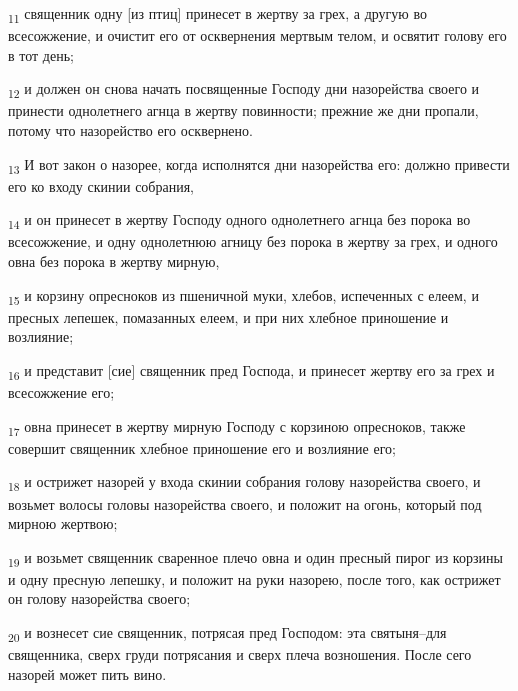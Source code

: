 \begin{tcolorbox}
\textsubscript{11} священник одну [из птиц] принесет в жертву за грех, а другую во всесожжение, и очистит его от осквернения мертвым телом, и освятит голову его в тот день;
\end{tcolorbox}
\begin{tcolorbox}
\textsubscript{12} и должен он снова начать посвященные Господу дни назорейства своего и принести однолетнего агнца в жертву повинности; прежние же дни пропали, потому что назорейство его осквернено.
\end{tcolorbox}
\begin{tcolorbox}
\textsubscript{13} И вот закон о назорее, когда исполнятся дни назорейства его: должно привести его ко входу скинии собрания,
\end{tcolorbox}
\begin{tcolorbox}
\textsubscript{14} и он принесет в жертву Господу одного однолетнего агнца без порока во всесожжение, и одну однолетнюю агницу без порока в жертву за грех, и одного овна без порока в жертву мирную,
\end{tcolorbox}
\begin{tcolorbox}
\textsubscript{15} и корзину опресноков из пшеничной муки, хлебов, испеченных с елеем, и пресных лепешек, помазанных елеем, и при них хлебное приношение и возлияние;
\end{tcolorbox}
\begin{tcolorbox}
\textsubscript{16} и представит [сие] священник пред Господа, и принесет жертву его за грех и всесожжение его;
\end{tcolorbox}
\begin{tcolorbox}
\textsubscript{17} овна принесет в жертву мирную Господу с корзиною опресноков, также совершит священник хлебное приношение его и возлияние его;
\end{tcolorbox}
\begin{tcolorbox}
\textsubscript{18} и острижет назорей у входа скинии собрания голову назорейства своего, и возьмет волосы головы назорейства своего, и положит на огонь, который под мирною жертвою;
\end{tcolorbox}
\begin{tcolorbox}
\textsubscript{19} и возьмет священник сваренное плечо овна и один пресный пирог из корзины и одну пресную лепешку, и положит на руки назорею, после того, как острижет он голову назорейства своего;
\end{tcolorbox}
\begin{tcolorbox}
\textsubscript{20} и вознесет сие священник, потрясая пред Господом: эта святыня--для священника, сверх груди потрясания и сверх плеча возношения. После сего назорей может пить вино.
\end{tcolorbox}
